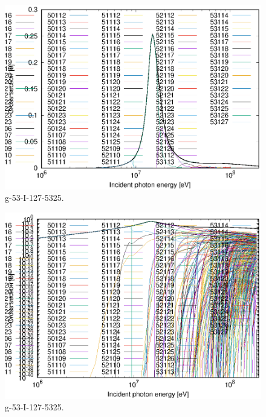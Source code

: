\begin{figure}
 \includegraphics[width=\linewidth]{eps/g_53-I-127_5325.eps}
  \caption{g-53-I-127-5325.}
\end{figure}
\begin{figure}
 \includegraphics[width=\linewidth]{eps-log/g_53-I-127_5325.eps}
 \caption{g-53-I-127-5325.}
\end{figure}
\newpage \clearpage

